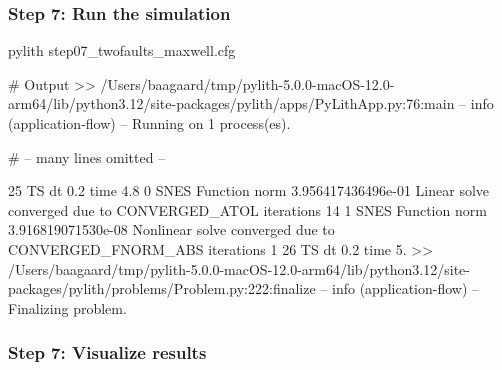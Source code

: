 \documentclass[aspectratio=169]{beamer}
\begin{document}
\begin{frame}[fragile]
  \frametitle{Step 7: Run the simulation}
  \summary{}

\begin{pyrejournal}
pylith step07_twofaults_maxwell.cfg

# Output
 >> /Users/baagaard/tmp/pylith-5.0.0-macOS-12.0-arm64/lib/python3.12/site-packages/pylith/apps/PyLithApp.py:76:main
 -- info (application-flow)
 -- Running on 1 process(es).

# -- many lines omitted --

25 TS dt 0.2 time 4.8
    0 SNES Function norm 3.956417436496e-01
      Linear solve converged due to CONVERGED_ATOL iterations 14
    1 SNES Function norm 3.916819071530e-08
    Nonlinear solve converged due to CONVERGED_FNORM_ABS iterations 1
26 TS dt 0.2 time 5.
 >> /Users/baagaard/tmp/pylith-5.0.0-macOS-12.0-arm64/lib/python3.12/site-packages/pylith/problems/Problem.py:222:finalize
 -- info (application-flow)
 -- Finalizing problem.
\end{pyrejournal}
  
\end{frame}


\begin{frame}
  \frametitle{Step 7: Visualize results}

    
\end{frame}



\end{document}
